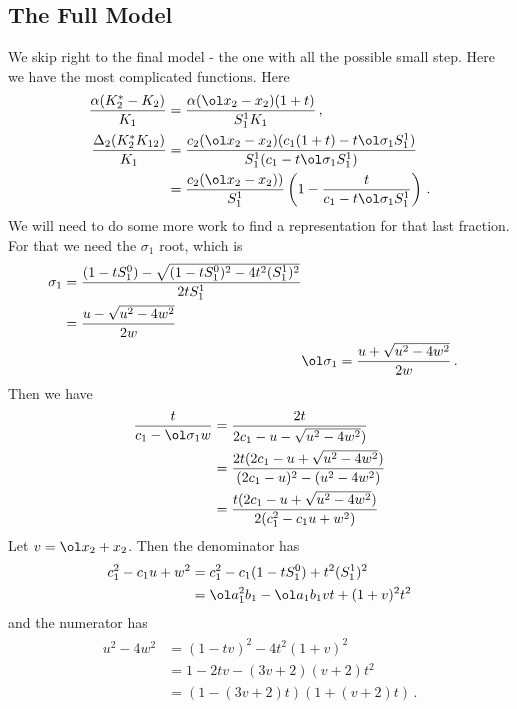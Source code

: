 \subsection{The Full Model}
We skip right to the final model - the one with all the possible small step. Here we have the most complicated functions. Here
\begin{align}
	\frac{\alpha(K_2^\ast -K_2)}{K_1}  &= \frac{\alpha (\ol x_2 - x_2)(1+t)}{S_1^1K_1}\,,\\
	\frac{\Delta_2(K_2^\ast K_{12})}{K_1} &= \frac{c_2(\ol x_2-x_2)(c_1(1+t)- t \ol \sigma_1S_1^1)}{S_1^1(c_1-t\ol \sigma_1S_1^1)}\\
	&=\frac{c_2(\ol x_2-x_2))}{S_1^1}\left(1-\frac{t}{c_1-t\ol \sigma_1S_1^1}\right)\,.
\end{align}
We will need to do some more work to find a representation for that last fraction. For that we need the $\sigma_1$ root, which is
\begin{align}
\begin{split}
	\sigma_1 &= \frac{(1-tS_1^0)-\sqrt{(1-tS_1^0)^2-4t^2(S_1^1)^2}}{2tS_1^1} \\
		&= \frac{u-\sqrt{u^2-4w^2}}{2w}\\
\end{split}\\
	&\ol \sigma_1 = \frac{u+\sqrt{u^2-4w^2}}{2w}\,.
\end{align}
Then we have
\begin{align}
\begin{split}
	\frac{t}{c_1-\ol \sigma_1w} &= \frac{2t}{2c_1-u-\sqrt{u^2-4w^2})} \\
	&= \frac{2t(2c_1-u+\sqrt{u^2-4w^2})}{(2c_1-u)^2-(u^2-4w^2)}\\
	&=  \frac{t(2c_1-u+\sqrt{u^2-4w^2})}{2(c_1^2-c_1u+w^2)}
\end{split}
\end{align}
Let $v = \ol x_2+x_2$. Then the denominator has
\begin{align}
\begin{split}
	c_1^2-c_1u+w^2 &= c_1^2-c_1(1-tS_1^0)+t^2(S_1^1)^2\\&=\ol a_1^2b_1 - \ol a_1b_1vt+(1+v)^2 t^2
\end{split}
\end{align}
and the numerator has
\begin{align}
\begin{split}
	u^2-4w^2 &= (1-tv)^2-4t^2(1+v)^2 \\&= 1-2tv-(3v+2)(v+2)t^2 \\&= (1-(3v+2)t)(1+(v+2)t)\,.
\end{split}
\end{align}

